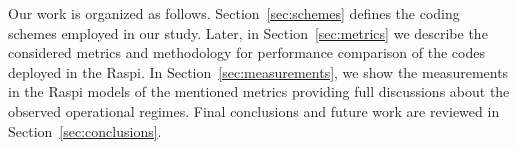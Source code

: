 Our work is organized as follows. Section~\ref{sec:schemes} defines the
coding schemes employed in our study. Later, in Section~\ref{sec:metrics}
we describe the considered metrics and methodology for performance comparison
of the codes deployed in the \ac{Raspi}. In Section~\ref{sec:measurements}, we
show the measurements in the \ac{Raspi} models of the mentioned metrics
providing full discussions about the observed operational regimes. Final
conclusions and future work are reviewed in Section~\ref{sec:conclusions}.

